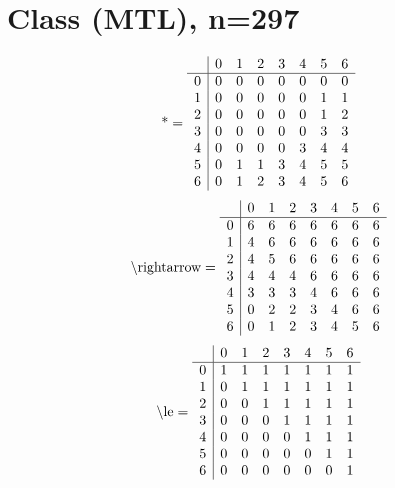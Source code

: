 \documentclass[11pt]{article}
\begin{document}
\section{Class (MTL), n=297}
\[\text{*} = 
\begin{array}{r | r r r r r r r}
 & 0 & 1 & 2 & 3 & 4 & 5 & 6 \\ \hline
0 & 0 & 0 & 0 & 0 & 0 & 0 & 0 \\
1 & 0 & 0 & 0 & 0 & 0 & 1 & 1 \\
2 & 0 & 0 & 0 & 0 & 0 & 1 & 2 \\
3 & 0 & 0 & 0 & 0 & 0 & 3 & 3 \\
4 & 0 & 0 & 0 & 0 & 3 & 4 & 4 \\
5 & 0 & 1 & 1 & 3 & 4 & 5 & 5 \\
6 & 0 & 1 & 2 & 3 & 4 & 5 & 6 \\
\end{array}
\]
\[\text{\textbackslash rightarrow} = 
\begin{array}{r | r r r r r r r}
 & 0 & 1 & 2 & 3 & 4 & 5 & 6 \\ \hline
0 & 6 & 6 & 6 & 6 & 6 & 6 & 6 \\
1 & 4 & 6 & 6 & 6 & 6 & 6 & 6 \\
2 & 4 & 5 & 6 & 6 & 6 & 6 & 6 \\
3 & 4 & 4 & 4 & 6 & 6 & 6 & 6 \\
4 & 3 & 3 & 3 & 4 & 6 & 6 & 6 \\
5 & 0 & 2 & 2 & 3 & 4 & 6 & 6 \\
6 & 0 & 1 & 2 & 3 & 4 & 5 & 6 \\
\end{array}
\]
\[\text{\textbackslash le} = 
\begin{array}{r | r r r r r r r}
 & 0 & 1 & 2 & 3 & 4 & 5 & 6 \\ \hline
0 & 1 & 1 & 1 & 1 & 1 & 1 & 1 \\
1 & 0 & 1 & 1 & 1 & 1 & 1 & 1 \\
2 & 0 & 0 & 1 & 1 & 1 & 1 & 1 \\
3 & 0 & 0 & 0 & 1 & 1 & 1 & 1 \\
4 & 0 & 0 & 0 & 0 & 1 & 1 & 1 \\
5 & 0 & 0 & 0 & 0 & 0 & 1 & 1 \\
6 & 0 & 0 & 0 & 0 & 0 & 0 & 1 \\
\end{array}
\]
\end{document}
